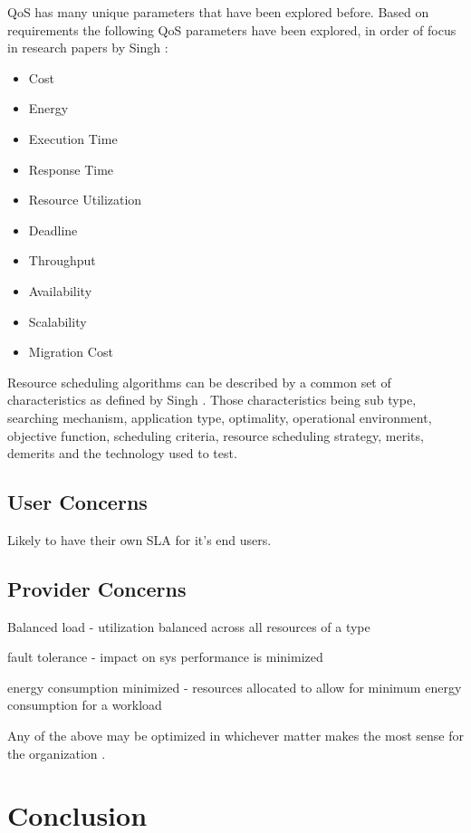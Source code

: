 \documentclass[fullapage,12pt]{article}
\begin{document}
QoS has many unique parameters that have been explored before. Based on requirements the following QoS parameters have been explored, in order of focus in research papers by Singh \cite{Singh2016}:
\begin{itemize}
    \item Cost
    \item Energy
    \item Execution Time
    \item Response Time
    \item Resource Utilization
    \item Deadline
    \item Throughput
    \item Availability
    \item Scalability
    \item Migration Cost
\end{itemize}

Resource scheduling algorithms can be described by a common set of characteristics as defined by Singh \cite{Singh2016}. Those characteristics being sub type, searching mechanism, application type, optimality, operational environment, objective function, scheduling criteria, resource scheduling strategy, merits, demerits and the technology used to test.

\subsection{User Concerns}

\cite{Jennings2015}
Likely to have their own SLA for it's end users.


\subsection{Provider Concerns} \label{provider-concerns}



Balanced load - utilization balanced across all resources of a type

fault tolerance - impact on sys performance is minimized

energy consumption minimized - resources allocated to allow for minimum energy consumption for a workload

Any of the above may be optimized in whichever matter makes the most sense for the organization \cite{Jennings2015}.




\section{Conclusion} \label{sec:conclusion}





\end{document}
